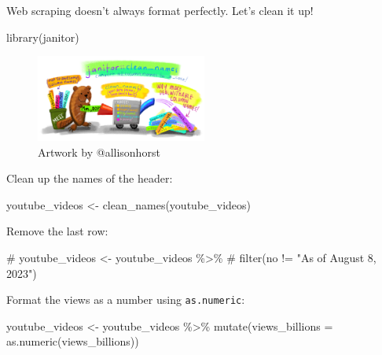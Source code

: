 \documentclass[
  letterpaper,
  DIV=11,
  numbers=noendperiod]{scrartcl}
\newenvironment{Shaded}{\begin{snugshade}}{\end{snugshade}}
\newcommand{\AttributeTok}[1]{\textcolor[rgb]{0.40,0.45,0.13}{#1}}
\newcommand{\CommentTok}[1]{\textcolor[rgb]{0.37,0.37,0.37}{#1}}
\newcommand{\FunctionTok}[1]{\textcolor[rgb]{0.28,0.35,0.67}{#1}}
\newcommand{\NormalTok}[1]{\textcolor[rgb]{0.00,0.23,0.31}{#1}}
\newcommand{\OtherTok}[1]{\textcolor[rgb]{0.00,0.23,0.31}{#1}}
\newcommand{\SpecialCharTok}[1]{\textcolor[rgb]{0.37,0.37,0.37}{#1}}
\begin{document}
Web scraping doesn't always format perfectly. Let's clean it up!

\begin{Shaded}
\begin{Highlighting}[]
\FunctionTok{library}\NormalTok{(janitor)}
\end{Highlighting}
\end{Shaded}

\begin{figure}

{\centering \includegraphics[width=0.5\textwidth,height=\textheight]{118_O_webscraping_tables_files/mediabag/79a12c01-0cc1-4643-b.png}

}

\caption{Artwork by @allisonhorst}

\end{figure}

Clean up the names of the header:

\begin{Shaded}
\begin{Highlighting}[]
\NormalTok{youtube\_videos }\OtherTok{\textless{}{-}} \FunctionTok{clean\_names}\NormalTok{(youtube\_videos)}
\end{Highlighting}
\end{Shaded}

Remove the last row:

\begin{Shaded}
\begin{Highlighting}[]
\CommentTok{\# youtube\_videos \textless{}{-} youtube\_videos \%\textgreater{}\% }
\CommentTok{\#   filter(no != "As of August 8, 2023")}
\end{Highlighting}
\end{Shaded}

Format the views as a number using \texttt{as.numeric}:

\begin{Shaded}
\begin{Highlighting}[]
\NormalTok{youtube\_videos }\OtherTok{\textless{}{-}}\NormalTok{ youtube\_videos }\SpecialCharTok{\%\textgreater{}\%} 
  \FunctionTok{mutate}\NormalTok{(}\AttributeTok{views\_billions =} \FunctionTok{as.numeric}\NormalTok{(views\_billions))}
\end{Highlighting}
\end{Shaded}
\end{document}
